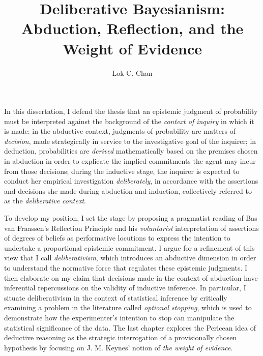\documentclass[PhD]{dukethesis2006}
\author{Lok C. Chan}
\title{Deliberative Bayesianism:\\Abduction, Reflection, and the Weight of Evidence}
\begin{document}
\maketitle

\makeabstract
\Copyright
\abstract
In this dissertation, I defend the thesis that an epistemic judgment of
probability must be interpreted against the background of the
\emph{context of inquiry} in which it is made: in the abductive context,
judgments of probability are matters of \emph{decision}, made
strategically in service to the investigative goal of the inquirer; in
deduction, probabilities are \emph{derived} mathematically based on the
premises chosen in abduction in order to explicate the implied
commitments the agent may incur from those decisions; during the
inductive stage, the inquirer is expected to conduct her empirical
investigation \emph{deliberately}, in accordance with the assertions and
decisions she made during abduction and induction, collectively referred
to as the \emph{deliberative context}.

To develop my position, I set the stage by proposing a pragmatist reading of Bas van Fraassen's Reflection Principle and his \emph{voluntarist} interpretation of assertions of degrees of beliefs as performative locutions to express the intention to undertake a proportional epistemic commitment. I argue for a refinement of this view that I call \emph{deliberativism}, which introduces an abductive dimension in order to understand the normative force that regulates these epistemic judgments. I then elaborate on my claim that decisions made in the context of abduction have inferential repercussions on the validity of inductive inference. In particular, I situate deliberativism in the context of statistical inference by critically examining a problem in the literature called \emph{optional stopping}, which is used to demonstrate how the experimenter's intention to stop can manipulate the statistical significance of the data. The last chapter explores the Pericean idea of deductive reasoning as the strategic interrogation of a provisionally chosen hypothesis by focusing on J. M. Keynes' notion of \emph{the weight of evidence}.


\singlespacing
\tableofcontents
\listoffigures
\listoftables
\doublespacing








\printbibliography[heading=bibintoc]
\end{document}
